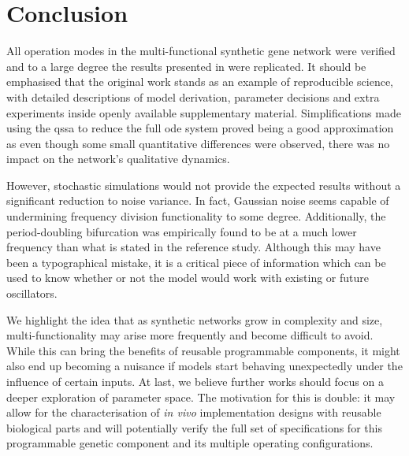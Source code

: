 \section{Conclusion}

  All operation modes in the multi-functional synthetic gene network were verified and to a large degree the results presented in \cite{multif} were replicated.
  It should be emphasised that the original work stands as an example of reproducible science, with detailed descriptions of model derivation, parameter decisions and extra experiments inside openly available supplementary material.
  Simplifications made using the \ac{qssa} to reduce the full \ac{ode} system proved being a good approximation as even though some small quantitative differences were observed, there was no impact on the network's qualitative dynamics.

  However, stochastic simulations would not provide the expected results without a significant reduction to noise variance.
  In fact, Gaussian noise seems capable of undermining frequency division functionality to some degree.
  Additionally, the period-doubling bifurcation was empirically found to be at a much lower frequency than what is stated in the reference study.
  Although this may have been a typographical mistake, it is a critical piece of information which can be used to know whether or not the model would work with existing or future oscillators.

  We highlight the idea that as synthetic networks grow in complexity and size, multi-functionality may arise more frequently and become difficult to avoid.
  While this can bring the benefits of reusable programmable components, it might also end up becoming a nuisance if models start behaving unexpectedly under the influence of certain inputs.
  At last, we believe further works should focus on a deeper exploration of parameter space.
  The motivation for this is double: it may allow for the characterisation of \textit{in vivo} implementation designs with reusable biological parts and will potentially verify the full set of specifications for this programmable genetic component and its multiple operating configurations.

